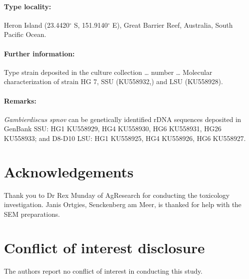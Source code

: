 \documentclass[12pt]{article}
\begin{document}
\paragraph{Type locality:} Heron Island (23.4420$^{\circ}$ S, 151.9140$^{\circ}$ E), Great Barrier Reef, Australia, South Pacific Ocean.
\paragraph{Further information:} Type strain deposited in the culture collection … number … Molecular characterization of strain HG 7, SSU (KU558932,) and LSU (KU558928).
\paragraph{Remarks:} \emph{Gambierdiscus spnov} can be genetically identified rDNA sequences deposited in GenBank SSU: HG1 KU558929, HG4 KU558930, HG6 KU558931, HG26 KU558933; and D8-D10 LSU: HG1 KU558925, HG4 KU558926, HG6 KU558927. 

\newpage
\section{Acknowledgements}
Thank you to Dr Rex Munday of AgResearch for conducting the toxicology investigation. Janis Ortgies, Senckenberg am Meer, is thanked for help with the SEM preparations.

\section{Conflict of interest disclosure}
The authors report no conflict of interest in conducting this study.
\newpage
\end{document}

